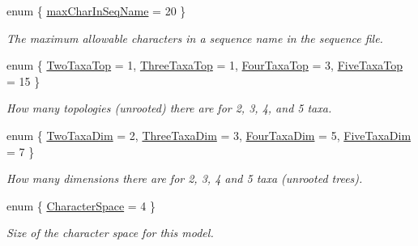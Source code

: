 \begin{DoxyCompactItemize}
\item 
enum \{ \hyperlink{classFPhyloPOT_a9b09c98520545b9c87c6993bf3c5f274aa74faf83373edcdf48ff35922dc009e2}{max\-Char\-In\-Seq\-Name} =  20
 \}
\begin{DoxyCompactList}\small\item\em \-The maximum allowable characters in a sequence name in the sequence file. \end{DoxyCompactList}\item 
enum \{ \hyperlink{classFPhyloPOT_a41644607ab4dda406006b7899c60eb24acff34dde110707699080ef23caaabf95}{\-Two\-Taxa\-Top} =  1, 
\hyperlink{classFPhyloPOT_a41644607ab4dda406006b7899c60eb24aecb40e300dc7b334d1e553e9f5ef029f}{\-Three\-Taxa\-Top} =  1, 
\hyperlink{classFPhyloPOT_a41644607ab4dda406006b7899c60eb24a414a29fd7f08137ceac0820da0431afe}{\-Four\-Taxa\-Top} =  3, 
\hyperlink{classFPhyloPOT_a41644607ab4dda406006b7899c60eb24ae0b78a85ed15c5205a7afe0e3737a768}{\-Five\-Taxa\-Top} =  15
 \}
\begin{DoxyCompactList}\small\item\em \-How many topologies (unrooted) there are for 2, 3, 4, and 5 taxa. \end{DoxyCompactList}\item 
enum \{ \hyperlink{classFPhyloPOT_a83a3e9f1c4025fc20c102ed2b819f9b8a3834f2c28027281be1d9fa2644e1bc31}{\-Two\-Taxa\-Dim} =  2, 
\hyperlink{classFPhyloPOT_a83a3e9f1c4025fc20c102ed2b819f9b8a37c5e4e34fbb63dde0bf8139fd5ebb1e}{\-Three\-Taxa\-Dim} =  3, 
\hyperlink{classFPhyloPOT_a83a3e9f1c4025fc20c102ed2b819f9b8a2eac51ac06777dcfec7cdb6185cfee60}{\-Four\-Taxa\-Dim} =  5, 
\hyperlink{classFPhyloPOT_a83a3e9f1c4025fc20c102ed2b819f9b8aa0ac7e30da8e23825246d366dec5c401}{\-Five\-Taxa\-Dim} =  7
 \}
\begin{DoxyCompactList}\small\item\em \-How many dimensions there are for 2, 3, 4 and 5 taxa (unrooted trees). \end{DoxyCompactList}\item 
enum \{ \hyperlink{classFPhyloPOT_af26457fdad1313b54245b464a08d2978ac4fc80c8577bb33e7bea00fad159e2ea}{\-Character\-Space} =  4
 \}
\begin{DoxyCompactList}\small\item\em \-Size of the character space for this model. \end{DoxyCompactList}\end{DoxyCompactItemize}
